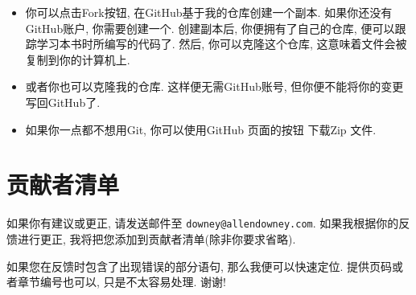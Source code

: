 \documentclass[12pt]{book}
\begin{document}
\begin{itemize}
\item 你可以点击{\sf Fork}按钮, 在GitHub基于我的仓库创建一个副本.
如果你还没有GitHub账户, 你需要创建一个.
创建副本后, 你便拥有了自己的仓库, 便可以跟踪学习本书时所编写的代码了.
然后, 你可以克隆这个仓库, 这意味着文件会被复制到你的计算机上.

\item 或者你也可以克隆我的仓库. 这样便无需GitHub账号,
但你便不能将你的变更写回GitHub了.

\item 如果你一点都不想用Git, 你可以使用GitHub
页面的按钮
下载Zip 文件.

\end{itemize}

\section*{贡献者清单}

如果你有建议或更正, 请发送邮件至 
{\tt downey@allendowney.com}.  
如果我根据你的反馈进行更正,
我将把您添加到贡献者清单(除非你要求省略).

如果您在反馈时包含了出现错误的部分语句,
那么我便可以快速定位.
提供页码或者章节编号也可以, 只是不太容易处理.
谢谢!
\end{document}
